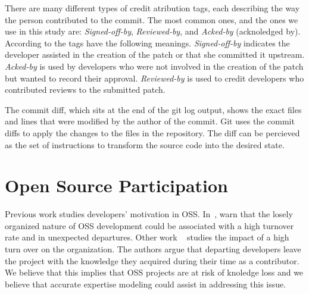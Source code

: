 There are many different types of credit atribution tags, each describing the way the person contributed to the commit. The most common ones, and the ones we use in this study are: \textit{Signed-off-by}, \textit{Reviewed-by}, and \textit{Acked-by} (acknoledged by). According to  the tags have the following meanings. \textit{Signed-off-by} indicates the developer assisted in the creation of the patch or that she committed it upstream. \textit{Acked-by} is used by developers who were not involved in the creation of the patch but wanted to record their approval. \textit{Reviewed-by} is used to credit developers who contributed reviews to the submitted patch. 

The commit diff, which sits at the end of the git log output, shows the exact files and lines that were modified by the author of the commit. Git uses the commit diffs to apply the changes to the files in the repository. The diff can be percieved as the set of instructions to transform the source code into the desired state.



\section{Open Source Participation}

Previous work studies developers' motivation in \ac{OSS}. In~\citep{Wu-oss}, warn that the losely organized nature of OSS development could be associated with a high turnover rate and in unexpected departures. Other work ~\citep{Rigby} studies the impact of a high turn over on the organization. The authors argue that departing developers leave the project with the knowledge they acquired during their time as a contributor. We believe that this implies that OSS projects are at risk of knoledge loss and we believe that accurate expertise modeling could assist in addressing this issue.




